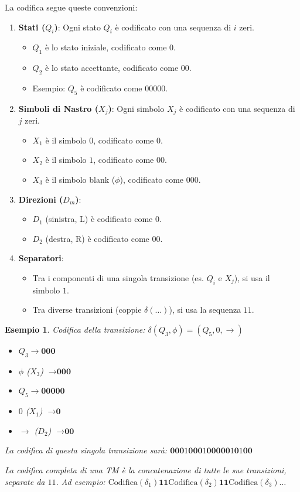 \documentclass[a4paper]{article}
\newtheorem{example}{Esempio}
\begin{document}
La codifica segue queste convenzioni:
\begin{enumerate}
    \item \textbf{Stati ($Q_i$)}: Ogni stato $Q_i$ è codificato con una sequenza di $i$ zeri.
    \begin{itemize}
        \item $Q_1$ è lo stato iniziale, codificato come $0$.
        \item $Q_2$ è lo stato accettante, codificato come $00$.
        \item Esempio: $Q_5$ è codificato come $00000$.
    \end{itemize}
    \item \textbf{Simboli di Nastro ($X_j$)}: Ogni simbolo $X_j$ è codificato con una sequenza di $j$ zeri.
    \begin{itemize}
        \item $X_1$ è il simbolo $0$, codificato come $0$.
        \item $X_2$ è il simbolo $1$, codificato come $00$.
        \item $X_3$ è il simbolo blank ($\phi$), codificato come $000$.
    \end{itemize}
    \item \textbf{Direzioni ($D_m$)}:
    \begin{itemize}
        \item $D_1$ (sinistra, L) è codificato come $0$.
        \item $D_2$ (destra, R) è codificato come $00$.
    \end{itemize}
    \item \textbf{Separatori}:
    \begin{itemize}
        \item Tra i componenti di una singola transizione (es. $Q_i$ e $X_j$), si usa il simbolo $1$.
        \item Tra diverse transizioni (coppie $\delta(\dots)$), si usa la sequenza $11$.
    \end{itemize}
\end{enumerate}

\begin{example}
Codifica della transizione: $\delta(Q_3, \phi) = (Q_5, 0, \rightarrow)$
\begin{itemize}
    \item $Q_3 \rightarrow \textbf{000}$
    \item $\phi$ ($X_3$) $\rightarrow \textbf{000}$
    \item $Q_5 \rightarrow \textbf{00000}$
    \item $0$ ($X_1$) $\rightarrow \textbf{0}$
    \item $\rightarrow$ ($D_2$) $\rightarrow \textbf{00}$
\end{itemize}
La codifica di questa singola transizione sarà:
$\textbf{000} \text{1} \textbf{000} \text{1} \textbf{00000} \text{1} \textbf{0} \text{1} \textbf{00}$

La codifica completa di una TM è la concatenazione di tutte le sue transizioni, separate da $11$. Ad esempio:
$\text{Codifica}(\delta_1) \textbf{11} \text{Codifica}(\delta_2) \textbf{11} \text{Codifica}(\delta_3) \dots$
\end{example}
\end{document}
